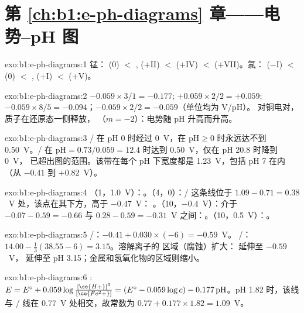 \section*{第 \ref{ch:b1:e-ph-diagrams} 章——电势--pH 图}

\begin{solution}{exo:b1:e-ph-diagrams:1}
锰： (0) $<$ ,  ($+$II) $<$ 
($+$IV) $<$  ($+$VII)。氯： ($-$I) $<$  (0)
$<$ ,  ($+$I) $<$  ($+$V)。
\end{solution}

\begin{solution}{exo:b1:e-ph-diagrams:2}
$-0.059 \times 3/1 = -0.177$; $+0.059 \times 2/2 = +0.059$;
$-0.059 \times 8/5 = -0.094$；$-0.059 \times 2/2 = -0.059$（单位均为 V/pH）。
对铜电对，质子在还原态一侧释放，
（$m = -2$）：电势随 pH 升高而升高。
\end{solution}

\begin{solution}{exo:b1:e-ph-diagrams:3}
/ 在 pH 0 时经过 0~V，在
$\mathrm{pH} \geqslant 0$ 时永远达不到 0.50~V。/ 在
$\mathrm{pH} = 0.73/0.059 = 12.4$ 时达到 0.50~V，仅在 pH 20.8 时降到 0~V，
已超出图的范围。该带在每个 pH 下宽度都是 \qty{1.23}{V}，包括 pH 7 在内
（从 $-0.41$ 到 $+0.82$~V）。
\end{solution}

\begin{solution}{exo:b1:e-ph-diagrams:4}
（1，1.0~V）：。（4，0）：/ 这条线位于
$1.09 - 0.71 = 0.38$~V 处，该点在其下方，高于 $-0.47$~V：
。（10，$-0.4$~V）：介于 $-0.07 - 0.59 = -0.66$ 与 $0.28 -
0.59 = -0.31$~V 之间：。（10，0.5~V）：。
\end{solution}

\begin{solution}{exo:b1:e-ph-diagrams:5}
/：$-0.41 + 0.030 \times (-6) = -0.59$~V。
/：$14.00 - \frac13(38.55 - 6) = 3.15$。溶解离子的
区域（腐蚀）扩大： 延伸至 $-0.59$~V，
 延伸至 pH 3.15；金属和氢氧化物的区域则缩小。
\end{solution}

\begin{solution}{exo:b1:e-ph-diagrams:6}
: $E = E^\circ + 0.059\log\frac{[\ce{H+}]^3}{[\ce{Fe^2+}]}
= (E^\circ - 0.059\log c) - 0.177\,\mathrm{pH}$。pH 1.82 时，该线与
/ 线在 0.77~V 处相交，故常数为 $0.77 + 0.177 \times 1.82
= 1.09$~V。
\end{solution}

